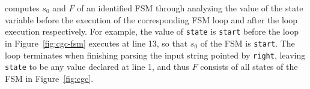 \Tool{} computes $s_0$ and $F$ of an identified FSM through analyzing the value of 
the state variable before the execution of the corresponding
FSM loop and after the loop execution respectively. 
For example, the value of \texttt{state} is \texttt{start} before 
the loop in Figure~\ref{fig:cgc-fsm} executes at line 13, 
so that $s_0$ of the FSM is \texttt{start}.
The loop terminates when finishing 
parsing the input string pointed by \texttt{right},
leaving \texttt{state} to be any value declared at line 1, 
and thus $F$ consists of all states of the FSM in Figure~\ref{fig:cgc}. 









